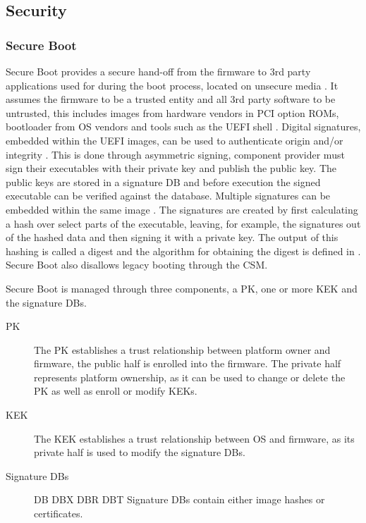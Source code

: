 
\subsection{Security}

\subsubsection{Secure Boot}

Secure Boot provides a secure hand-off from the firmware to 3rd party applications used for during the boot process, located on unsecure media \cite{tianocore-understanding-uefi-secure-boot-chain}\cite[32.2 and 32.5.1]{uefi-spec}.
It assumes the firmware to be a trusted entity and all 3rd party software to be untrusted, this includes images from hardware vendors in \ac{PCI} option \acp{ROM}, bootloader from \ac{OS} vendors and tools such as the \ac{UEFI} shell \cite{tianocore-understanding-uefi-secure-boot-chain}.
Digital signatures, embedded within the \ac{UEFI} images, can be used to authenticate origin and/or integrity \cite[32.2]{uefi-spec}.
This is done through asymmetric signing, component provider must sign their executables with their private key and publish the public key.
The public keys are stored in a signature \ac{DB} and before execution the signed executable can be verified against the database.
Multiple signatures can be embedded within the same image \cite[32.2.2]{uefi-spec}.
The signatures are created by first calculating a hash over select parts of the executable, leaving, for example, the signatures out of the hashed data and then signing it with a private key.
The output of this hashing is called a digest and the algorithm for obtaining the digest is defined in \cite{microsoft-pe-signature-format}.
Secure Boot also disallows legacy booting through the \ac{CSM}.

Secure Boot is managed through three components, a \ac{PK}, one or more \ac{KEK} and the signature \acp{DB}.

\begin{description}
    \item[\ac{PK}]
        The \ac{PK} establishes a trust relationship between platform owner and firmware, the public half is enrolled into the firmware.
        The private half represents platform ownership, as it can be used to change or delete the \ac{PK} as well as enroll or modify \acp{KEK}.
    \item[\ac{KEK}]
        The \ac{KEK} establishes a trust relationship between \ac{OS} and firmware, as its private half is used to modify the signature \acp{DB}.
    \item[Signature \acfp{DB}]
        \ac{DB} \ac{DBX} \ac{DBR} \ac{DBT}
        Signature \acp{DB} contain either image hashes or certificates.
\end{description}


